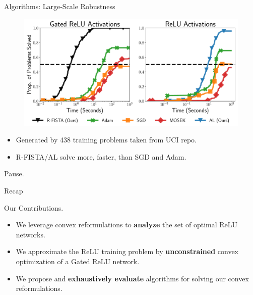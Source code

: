 \documentclass[usenames,dvipsnames,mathserif,notheorems]{beamer}
\begin{document}
\begin{frame}{Algorithms: Large-Scale Robustness}
	\begin{figure}[t]
		\centering
		\includegraphics[width=1\linewidth]{assets/pp_main.pdf}
	\end{figure}
	\begin{itemize}
		\item Generated by 438 training problems taken from UCI repo.
		\item R-FISTA/AL solve more, faster, than SGD and Adam.
	\end{itemize}
\end{frame}


\begin{frame}{}
	\begin{center}
		\huge Pause.
	\end{center}
\end{frame}

\begin{frame}{Recap}
	\begin{center}
		\huge   Our Contributions.
	\end{center}

	\vspace{2em}
	\pause
	{ \large
		\begin{itemize}
			\item We leverage convex reformulations to \textbf{analyze} the set
			      of optimal ReLU networks.
			      \pause
			      \vspace{0.5em}

			\item We approximate the ReLU training problem by \textbf{unconstrained}
			      convex optimization of a Gated ReLU network.\pause
			      \vspace{0.5em}

			\item We propose and \textbf{exhaustively evaluate} algorithms for solving
			      our convex reformulations.
		\end{itemize}
	}

\end{frame}
\end{document}
